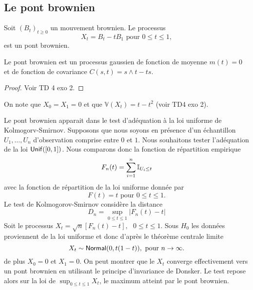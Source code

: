 \subsection{Le pont brownien}
\begin{definition}
Soit $(B_t)_{t\geq 0}$ un mouvement brownien. Le processus 
$$
X_t = B_t - tB_1\text{ pour }0\leq t\leq 1,
$$
est un pont brownien. 
\end{definition}
\begin{prop}
Le pont brownien est un processus gaussien de fonction de moyenne $m(t) = 0$ et de fonction de covariance $C(s,t) = s\land t - ts$.
\end{prop}
\begin{proof}
Voir TD 4 exo 2.
\end{proof}
On note que $X_0 = X_1 = 0$ et que $\mathbb{V}(X_t) = t - t^2$ (voir TD4 exo 2).
\begin{ex}
Le pont brownien apparait dans le test d'adéquation à la loi uniforme de Kolmogorv-Smirnov. Supposons que nous soyons en présence d'un échantillon $U_1,\ldots, U_n$ d'observation comprise entre $0$ et $1$. Nous souhaitons tester l'adéquation de la loi $\mathsf{Unif}([0,1])$. Nous comparons donc la fonction de répartition empirique 
$$
F_n(t) = \sum_{i=1}^n\mathbb{I}_{U_i\leq t}
$$
avec la fonction de répartition de la loi uniforme donnée par 
$$
F(t) = t\text{ pour }0\leq t\leq 1.
$$
Le test de Kolmogorov-Smirnov considère la distance 
$$
D_n = \sup_{0\leq t\leq 1}|F_n(t)-t|
$$
Soit le processus $X_t = \sqrt{n}[F_n(t)-t],\text{ }0\leq t\leq 1$. Sous $H_0$ les données proviennent de la loi uniforme et donc d'après le théorème centrale limite 
$$
X_t\sim\mathsf{Normal}(0, t(1-t)),\text{ pour }n\rightarrow \infty.
$$
de plus $X_0 = 0$ et $X_1 = 0$. On peut montrer que le $X_t$ converge effectivement vers un pont brownien en utilisant le principe d'invariance de Donsker. Le test repose alors sur la loi de $\sup_{0\leq t\leq 1} X_t$, le maximum atteint par le pont brownien.
\end{ex}

